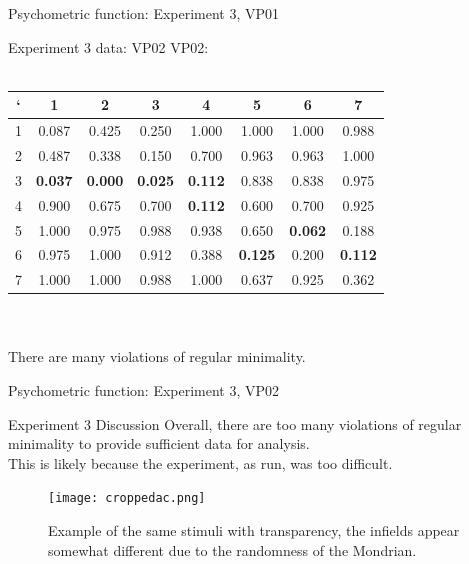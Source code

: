 \documentclass{beamer}
\begin{document}
\begin{frame}[t]{Psychometric function: Experiment 3, VP01}
\end{frame}

\begin{frame}[t]{Experiment 3 data: VP02}
VP02:\\
~\\
\begin{tabular}{c | c c c c c c c}
` & 1 & 2 & 3 & 4 & 5 & 6 & 7 \\ \hline

1 & {\color{red} 0.087} & 0.425 & 0.250 & 1.000 & 1.000 & 1.000 & 0.988\\

2 & 0.487 & 0.338 & {\color{red} 0.150} & 0.700 & 0.963 & 0.963 & 1.000\\

3 & {\bf 0.037} & {\bf \color{red} 0.000} & {\bf 0.025} & {\bf 0.112} & 0.838 & 0.838 & 0.975\\

4 & 0.900 & 0.675 & 0.700 & {\bf \color{red} 0.112} & 0.600 & 0.700 & 0.925\\

5 & 1.000 & 0.975 & 0.988 & 0.938 & 0.650 & {\bf \color{red} 0.062} & 0.188\\

6 & 0.975 & 1.000 & 0.912 & 0.388 & {\bf 0.125} & 0.200 & {\bf \color{red} 0.112}\\

7 & 1.000 & 1.000 & 0.988 & 1.000 & 0.637 & 0.925 & {\color{red} 0.362}\\

\end{tabular}
\\
~\\
There are many violations of regular minimality.

\end{frame}

\begin{frame}[t]{Psychometric function: Experiment 3, VP02}
\end{frame}




\begin{frame}[t]{Experiment 3 Discussion}
Overall, there are too many violations of regular minimality to provide sufficient data for analysis.\\

This is likely because the experiment, as run, was too difficult.

\begin{figure}[c]
\texttt{[image: croppedac.png]}
\caption{Example of the same stimuli with transparency, the infields appear somewhat different due to the randomness of the Mondrian.}
\end{figure}

\end{frame}
\end{document}
